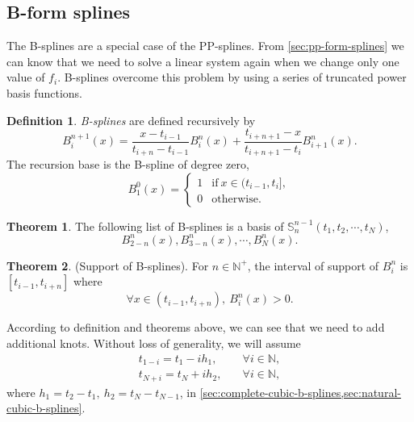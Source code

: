 \documentclass[a4paper]{article}
\theoremstyle{definition}
\newtheorem{definition}{Definition}
\newtheorem{theorem}{Theorem}
\begin{document}
\subsection{B-form splines}

The B-splines are a special case of the PP-splines. From \cref{sec:pp-form-splines} we can know that we need to solve a linear system again when we change only one value of $f_i$. B-splines overcome this problem by using a series of truncated power basis functions.

\begin{definition}
  \textit{B-splines} are defined recursively by 
  \begin{equation}
    B_i^{n + 1}(x) = \frac{x - t_{i- 1}}{t_{i + n} - t_{i - 1}}B_i^n(x) + \frac{t_{i + n + 1} - x}{t_{i + n + 1} - t_i}B_{i + 1}^n(x).
    \label{eq:b-spline-recursive}
  \end{equation}
  The recursion base is the B-spline of degree zero,
  \begin{equation}
    B_1^0(x) = \begin{cases}
      1 & \text{if}\ x \in (t_{i - 1}, t_i], \\
      0 & \text{otherwise}.
    \end{cases}
  \end{equation}
  \label{def:b-spline}
\end{definition}

\begin{theorem}
  The following list of B-splines is a basis of $\mathbb{S}_n^{n - 1}(t_1, t_2, \cdots, t_N)$,
  \begin{equation}
    B_{2 - n}^n(x), B_{3 - n}^n(x), \cdots, B_{N}^n(x).
    \label{eq:b-spline-basis}
  \end{equation}
\end{theorem}

\begin{theorem}
  (Support of B-splines). For $n \in \mathbb{N}^+$, the interval of support of $B_i^n$ is $[t_{i - 1}, t_{i + n}]$ where 
  \begin{equation}
    \forall x \in (t_{i - 1}, t_{i + n}),\ B_i^n(x) > 0.
    \label{eq:b-spline-support}
  \end{equation}
  \label{thm:b-spline-support}
\end{theorem}

According to definition and theorems above, we can see that we need to add additional knots. Without loss of generality, we will assume 
\begin{equation}
  \begin{aligned}
    t_{1 - i} = t_1 - ih_1,& \quad \forall i \in \mathbb{N}, \\
    t_{N + i} = t_N + ih_2,& \quad \forall i \in \mathbb{N},
  \end{aligned}
  \label{eq:cubic-b-spline-knots}
\end{equation}
where $h_1 = t_2 - t_1,\ h_2 = t_N - t_{N - 1}$, in \cref{sec:complete-cubic-b-splines,sec:natural-cubic-b-splines}.
\end{document}
